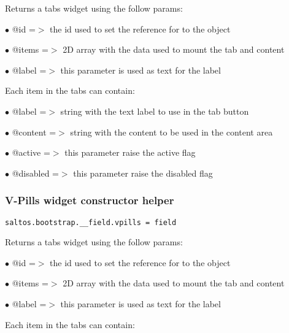 \documentclass[a4paper]{article}
\begin{document}
Returns a tabs widget using the follow params:

\begin{compactitem}
\item[\color{myblue}$\bullet$] @id    =$>$ the id used to set the reference for to the object
\item[\color{myblue}$\bullet$] @items =$>$ 2D array with the data used to mount the tab and content
\item[\color{myblue}$\bullet$] @label    =$>$ this parameter is used as text for the label
\end{compactitem}

Each item in the tabs can contain:

\begin{compactitem}
\item[\color{myblue}$\bullet$] @label    =$>$ string with the text label to use in the tab button
\item[\color{myblue}$\bullet$] @content  =$>$ string with the content to be used in the content area
\item[\color{myblue}$\bullet$] @active   =$>$ this parameter raise the active flag
\item[\color{myblue}$\bullet$] @disabled =$>$ this parameter raise the disabled flag
\end{compactitem}

\hypertarget{toc647}{}
\subsubsection{V-Pills widget constructor helper}

\begin{lstlisting}
saltos.bootstrap.__field.vpills = field
\end{lstlisting}

Returns a tabs widget using the follow params:

\begin{compactitem}
\item[\color{myblue}$\bullet$] @id    =$>$ the id used to set the reference for to the object
\item[\color{myblue}$\bullet$] @items =$>$ 2D array with the data used to mount the tab and content
\item[\color{myblue}$\bullet$] @label    =$>$ this parameter is used as text for the label
\end{compactitem}

Each item in the tabs can contain:
\end{document}
